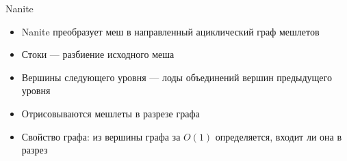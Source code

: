 \begin{frame}{Nanite}
    \begin{itemize}
        \item Nanite преобразует меш в направленный ациклический граф мешлетов
        \item Стоки --- разбиение исходного меша
        \item Вершины следующего уровня --- лоды объединений вершин предыдущего уровня
        \item Отрисовываются мешлеты в разрезе графа
        \item Свойство графа: из вершины графа за $O(1)$ определяется, входит ли она в разрез
    \end{itemize}
    \begin{center}
        
        
    \end{center}
\end{frame}
